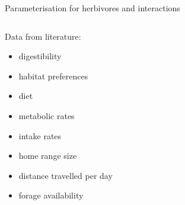 \documentclass[10pt,aspectratio=149]{beamer}
\begin{document}
\begin{frame}{Parameterisation for herbivores and interactions}

\begin{columns}
\begin{column}{0.35\textwidth}

Data from literature:
\small{
\begin{itemize}

\item digestibility
\item habitat preferences
\item diet
\item metabolic rates
\item intake rates
\item home range size
\item distance travelled per day
\item forage availability

\end{itemize}
}
\end{column}
\begin{column}{0.65\textwidth}

\end{column}
\end{columns}
\end{frame}
\end{document}
